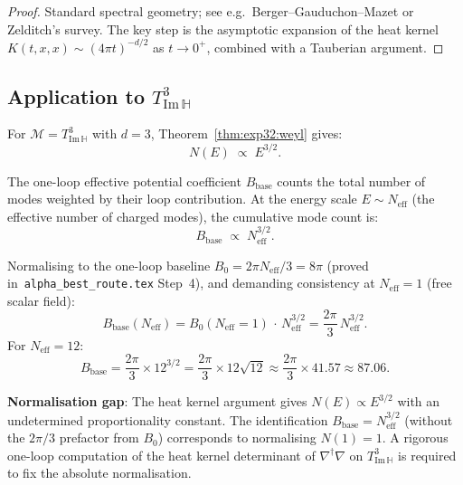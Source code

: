 \documentclass[12pt,a4paper]{article}
\theoremstyle{definition}
\theoremstyle{remark}
\begin{document}
\begin{proof}
Standard spectral geometry; see e.g.\ Berger--Gauduchon--Mazet or
Zelditch's survey.  The key step is the asymptotic expansion of the heat kernel
$K(t, x, x) \sim (4\pi t)^{-d/2}$ as $t \to 0^+$, combined with a
Tauberian argument.
\end{proof}

\subsection{Application to $T^3_{\mathrm{Im}\,\mathbb{H}}$}
\label{ssec:exp32:hk:application}

For $\mathcal{M} = T^3_{\mathrm{Im}\,\mathbb{H}}$ with $d = 3$,
Theorem~\ref{thm:exp32:weyl} gives:
\begin{equation}
  N(E) \;\propto\; E^{3/2}.
  \label{eq:exp32:N_E_32}
\end{equation}

The one-loop effective potential coefficient $B_{\mathrm{base}}$ counts the total
number of modes weighted by their loop contribution.  At the energy scale
$E \sim N_{\mathrm{eff}}$ (the effective number of charged modes), the cumulative
mode count is:
\begin{equation}
  B_{\mathrm{base}} \;\propto\; N_{\mathrm{eff}}^{3/2}.
  \label{eq:exp32:Bbase_hk}
\end{equation}

Normalising to the one-loop baseline $B_0 = 2\pi N_{\mathrm{eff}}/3 = 8\pi$
(proved in~\texttt{alpha\_best\_route.tex} Step~4), and demanding consistency
at $N_{\mathrm{eff}} = 1$ (free scalar field):
\begin{equation}
  B_{\mathrm{base}}(N_{\mathrm{eff}})
  = B_0(N_{\mathrm{eff}}=1)\, \cdot\, N_{\mathrm{eff}}^{3/2}
  = \frac{2\pi}{3}\, N_{\mathrm{eff}}^{3/2}.
  \label{eq:exp32:Bbase_normalized}
\end{equation}
For $N_{\mathrm{eff}} = 12$:
\begin{equation}
  B_{\mathrm{base}} = \frac{2\pi}{3} \times 12^{3/2}
  = \frac{2\pi}{3} \times 12\sqrt{12}
  \approx \frac{2\pi}{3} \times 41.57
  \approx 87.06.
  \label{eq:exp32:Bbase_value}
\end{equation}

\begin{gapbox}
\textbf{Normalisation gap}: The heat kernel argument gives $N(E) \propto E^{3/2}$
with an undetermined proportionality constant.  The identification
$B_{\mathrm{base}} = N_{\mathrm{eff}}^{3/2}$ (without the $2\pi/3$ prefactor from
$B_0$) corresponds to normalising $N(1) = 1$.  A rigorous one-loop computation of
the heat kernel determinant of $\nabla^\dagger\nabla$ on $T^3_{\mathrm{Im}\,\mathbb{H}}$
is required to fix the absolute normalisation.
\end{gapbox}
\end{document}
